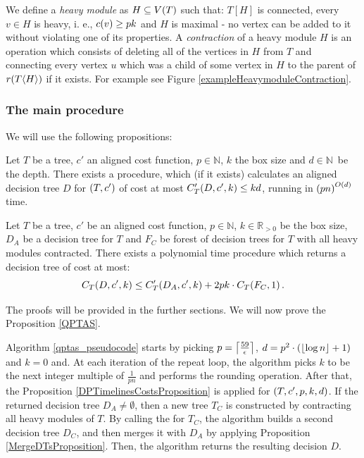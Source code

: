 
We define a \textit{heavy module} as $H\subseteq V\mathopen{}\left( T \right)$ such that: $T[H]$ is connected, every $v \in H$ is heavy, i. e., $c\mathopen{}\left( v \right)\geq pk$ and $H$ is maximal - no vertex can be added to it without violating one of its properties. A \textit{contraction} of a heavy module $H$ is an operation which consists of deleting all of the vertices in $H$ from $T$ and connecting every vertex $u$ which was a child of some vertex in $H$ to the parent of $r\mathopen{}\left( T\mathopen{}\langle H \rangle \right)$ if it exists. For example see Figure \ref{exampleHeavymoduleContraction}.

\subsubsection{The main procedure}

We will use the following propositions:
\begin{proposition}\label{DPTimelinesCostsProposition}
     Let $T$ be a tree, $c'$ an aligned cost function, $p\in \mathbb{N}$, $k$ the box size and $d\in \mathbb{N}$~be the depth. There exists a \FDPTimelinesCosts procedure, which (if it exists) calculates an aligned decision tree $D$ for $\mathopen{}\left( T,c' \right)$ of cost at most $C'_{T}\mathopen{}\left( D,c',k \right)\leq kd$, running in $\mathopen{}\left( pn \right)^{O\mathopen{}\left( d \right)}$ time.
\end{proposition}
\begin{proposition}\label{MergeDTsProposition}
    Let $T$ be a tree, $c'$ be an aligned cost function, $p\in \mathbb{N}$, $k\in \mathbb{R}_{>0}$ be the box size, $D_A$ be a decision tree for $T$ and $F_C$ be forest of decision trees for $T$ with all heavy modules contracted. There exists a polynomial time \FMergeDTs procedure which returns a decision tree of cost at most:
        $$
            C_{T}\mathopen{}\left( D,c',k \right)\leq C'_{T}\mathopen{}\left( D_A,c',k \right)+2pk\cdot C_{T}\mathopen{}\left( F_C,1 \right).
        $$
\end{proposition}
The proofs will be provided in the further sections.
We will now prove the Proposition \ref{QPTAS}.



Algorithm \ref{qptas_pseudocode} starts by picking $p=\mathopen{}\left\lceil \frac{59}{\epsilon} \right\rceil$, $d=p^2\cdot\mathopen{}\left( \mathopen{}\left\lfloor \log n \right\rfloor+1 \right)$ and $k=0$ and. At each iteration of the repeat loop, the algorithm picks $k$ to be the next 
integer multiple of $\frac{1}{pn}$ and performs the rounding operation. After that, the Proposition \ref{DPTimelinesCostsProposition} is applied for $\mathopen{}\left( T,c',p,k,d \right)$. If the returned decision tree $D_A\neq\emptyset$, then a new tree $T_C$ is constructed by contracting all heavy modules of $T$. By calling the \FRankingBasedDT for $T_C$, the algorithm builds a second decision tree $D_C$, and then merges it with $D_A$ by applying Proposition \ref{MergeDTsProposition}. Then, the algorithm returns the resulting decision $D$.

